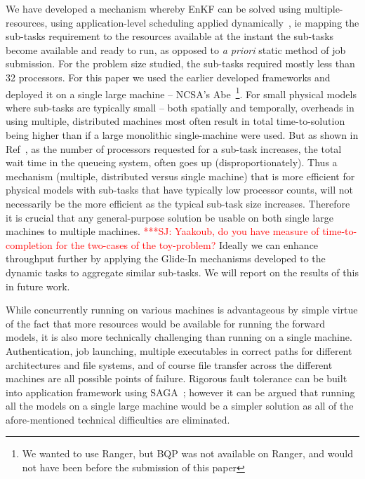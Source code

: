 \documentclass[conference,final]{IEEEtran}
\newcommand{\jhanote}[1]{ {\textcolor{red} { ***SJ: #1 }}}
\newcommand{\jhanote}[1]{}
\begin{document}
We have developed a mechanism whereby EnKF can be
solved using multiple-resources, using application-level scheduling
applied dynamically~\cite{saga_tg08}, ie mapping the sub-tasks
requirement to the resources available at the instant the sub-tasks
become available and ready to run, as opposed to {\it a priori} static
method of job submission. For the problem size studied, the sub-tasks
required mostly less than 32 processors. For this paper we used the
earlier developed frameworks and deployed it on a single large machine
-- NCSA's Abe~\footnote{We wanted to use Ranger, but BQP was not
  available on Ranger, and would not have been before the submission
  of this paper}. For small physical models where sub-tasks are
typically small -- both spatially and temporally, overheads in using
multiple, distributed machines most often result in total
time-to-solution being higher than if a large monolithic
single-machine were used. But as shown in
Ref~\cite{novelsubmissionmode}, as the number of processors requested
for a sub-task increases, the total wait time in the queueing system,
often goes up (disproportionately). Thus a mechanism (multiple,
distributed versus single machine) that is more efficient for physical
models with sub-tasks that have typically low processor counts, will
not necessarily be the more efficient as the typical sub-task size
increases. Therefore it is crucial that any general-purpose solution be
usable on both single large machines to multiple machines.
\jhanote{Yaakoub, do you have measure of time-to-completion for the
  two-cases of the toy-problem?} Ideally we can enhance throughput
further by applying the Glide-In mechanisms developed to the dynamic
tasks to aggregate similar sub-tasks. We will report on the results of
this in future work.


While concurrently running on various machines is advantageous by
simple virtue of the fact that more resources would be available for
running the forward models, it is also more technically challenging
than running on a single machine.  Authentication, job launching,
multiple executables in correct paths for different architectures and
file systems, and of course file transfer across the different
machines are all possible points of failure. Rigorous fault tolerance
can be built into application framework using
SAGA~\cite{Luckow:2008la}; however it can be argued that running all
the models on a single large machine would be a simpler solution as
all of the afore-mentioned technical difficulties are eliminated.
\end{document}
